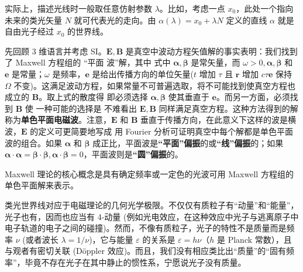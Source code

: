 实际上，描述光线时一般取任意仿射参数 $\lambda$。比如，考虑一点 $x_{0}$，此处一个指向未来的类光矢量 $N$ 就可代表光的走向。由 $\alpha(\lambda)=x_{0}+\lambda N$ 定义的直线 $\alpha$ 就是自由光子经过 $x_{0}$ 的世界线。

先回顾 3 维语言并考虑 SI。$\bm{E},\bm{B}$ 是真空中波动方程矢值解的事实表明：我们找到了 Maxwell 方程组的 “平面 波”解，其中
式中 $\bm{\alpha},\bm{\beta}$ 是常矢量，而 
$\omega>0,\bm{\alpha},\bm{\beta}$ 和 $\bm{e}$ 是常量；$\omega$ 是频率，$\bm{e}$ 是给出传播方向的单位矢量($t$ 增加 $\tau$ 且 $\bm r$ 增加 $c \tau \bm{e}$ 保持 $\Omega$ 不变)。这满足波动方程，如果常量不可普遍选取，将不可能找到使真空方程也成立的 $\bm B$。取上式的散度得
即必须选择 $\bm{\alpha},\bm{\beta}$ 使其垂直于 $\bm{e}$。而另一方面，必须找到 $\bm{B}$ 使
一种可能的选择是
不难看出 $\bm{E},\bm{B}$ 同样满足真空方程。这种方法得到的解称为\textbf{单色平面电磁波}。注意，$\bm{E}$ 和 $\bm{B}$ 垂直于传播方向，在此意义下这样的波是横波，$\bm{E}$ 的定义可更简要地写成
用 Fourier 分析可证明真空中每个解都是单色平面波的组合。如果 $\bm{\alpha}$ 和 $\bm{\beta}$ 成正比，平面波是\textbf{“平面”偏振}的或\textbf{“线”偏振}的；如果 $\bm{\alpha} \cdot \bm{\alpha}=\bm{\beta} \cdot \bm{\beta},\bm{\alpha} \cdot \bm{\beta}=0$，平面波则是\textbf{“圆”偏振}的。

Maxwell 理论的核心概念是具有确定频率或一定色的光波可用 Maxwell 方程组的单色平面解来表示。




类光世界线对应于电磁理论的几何光学极限。不仅仅有质粒子有“动量”和“能量”，光子也有，因而也应当有 4-动量 (例如光电效应，在这种效应中光子与逃离原子中电子轨道的电子之间的碰撞)。然而，不像有质粒子，光子的特性不是质量而是频率 $\nu$ (或者波长 $\lambda=1 / \nu$)，它与能量 $\varepsilon$ 的关系是 $\varepsilon=h\nu$（$h$ 是 Planck 常数），且与观者有密切关联 (D\"oppler 效应)。而且，我们没有相应类比出“质量”的“固有频率”，毕竟不存在光子在其中静止的惯性系，宁愿说光子没有质量。

